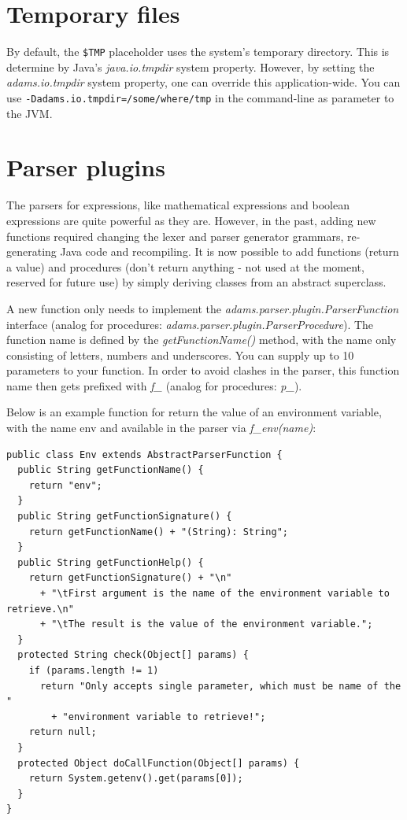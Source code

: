 \chapter{Temporary files}
By default, the \texttt{\${TMP}} placeholder uses the system's temporary
directory. This is determine by Java's \textit{java.io.tmpdir} system property.
However, by setting the \textit{adams.io.tmpdir} system property, one can override
this application-wide. You can use \texttt{-Dadams.io.tmpdir=/some/where/tmp}
in the command-line as parameter to the JVM.


\chapter{Parser plugins}
The parsers for expressions, like mathematical expressions and boolean expressions 
are quite powerful as they are. However, in the past, adding new functions required changing 
the lexer and parser generator grammars, re-generating Java code and recompiling. 
It is now possible to add functions (return a value) and procedures (don't return 
anything - not used at the moment, reserved for future use) by simply deriving
classes from an abstract superclass.

A new function only needs to implement the \textit{adams.parser.plugin.ParserFunction}
interface (analog for procedures: \textit{adams.parser.plugin.ParserProcedure}). 
The function name is defined by the \textit{getFunctionName()} method, with the 
name only consisting of letters, numbers and underscores. You can supply up to 
10 parameters to your function. In order to avoid clashes in the parser, this 
function name then gets prefixed with \textit{f\_} (analog for procedures: \textit{p\_}).

Below is an example function for return the value of an environment variable, 
with the name env and available in the parser via \textit{f\_env(name)}:
{\small
\begin{verbatim}
public class Env extends AbstractParserFunction {
  public String getFunctionName() {
    return "env";
  }
  public String getFunctionSignature() {
    return getFunctionName() + "(String): String";
  }
  public String getFunctionHelp() {
    return getFunctionSignature() + "\n"
      + "\tFirst argument is the name of the environment variable to retrieve.\n"
      + "\tThe result is the value of the environment variable.";
  }
  protected String check(Object[] params) {
    if (params.length != 1)
      return "Only accepts single parameter, which must be name of the "
        + "environment variable to retrieve!";
    return null;
  }
  protected Object doCallFunction(Object[] params) {
    return System.getenv().get(params[0]);
  }
}
\end{verbatim}
}

